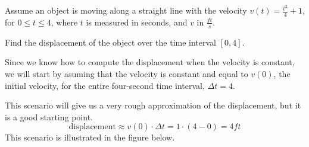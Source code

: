 \documentclass{ximera}
\begin{document}
\begin{example}
  Assume an object is moving along a straight line with the velocity
  $v(t)=\frac{t^2}{4}+1$, for $0\le t\le4$, where $t$ is measured in
  seconds, and $v$ in $\frac{\unit{ft}}{\unit{s}}$.
  
  Find the displacement of the object over the time interval $[0,4]$. 
  \begin{explanation}
   Since we know how to compute the displacement when the velocity is
   constant, we will start by asuming that the velocity is constant
   and equal to $v(0)$, the initial velocity, for the entire
   four-second time interval, $\Delta t=4$.
   
   This scenario will give us a very rough approximation of the
   displacement, but it is a good starting point.
  \[
   \text{displacement}\approx v(0)\cdot\Delta t=1\cdot(4-0)=4 \unit{ft}
  \]
This scenario is illustrated in the figure below.
 \begin{image}
\end{image}
\end{explanation}
\end{example}
\end{document}
